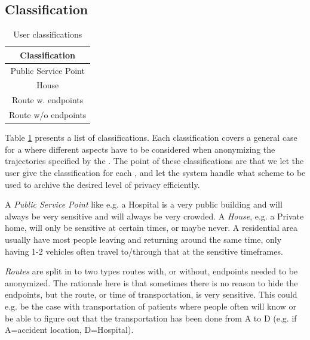 \subsection{\poi Classification}\label{subsec:protectpoitype}

\begin{table}
	\begin{center}
		\begin{tabular}{|c|}
			\hline
			\bf Classification	\\\hline
			Public Service Point	\\\hline
			House			\\\hline
			Route w. endpoints	\\\hline
			Route w/o endpoints	\\\hline
		\end{tabular}
	\end{center}
\caption{User \poi classifications} 
\label{tab:poiclass1}
\end{table}

Table \ref{tab:poiclass1} presents a list of \poi classifications. Each classification covers a general case for a \poi where different aspects have to be considered when anonymizing the trajectories specified by the \poins. The point of these classifications are that we let the user give the classification for each \poi, and let the system handle what scheme to be used to archive the desired level of privacy efficiently. 

A {\it Public Service Point} like e.g. a Hospital is a very public building and will always be very sensitive and will always be very crowded. A {\it House}, e.g. a Private home, will only be sensitive at certain times, or maybe never. A residential area usually have most people leaving and returning around the same time, only having 1-2 vehicles often travel to/through that \poi at the sensitive timeframes.

{\it Routes} are split in to two types routes with, or without, endpoints needed to be anonymized. The rationale here is that sometimes there is no reason to hide the endpoints, but the route, or time of transportation, is very sensitive. This could e.g. be the case with transportation of patients where people often will know or be able to figure out that the transportation has been done from A to D (e.g. if A=accident location, D=Hospital).


